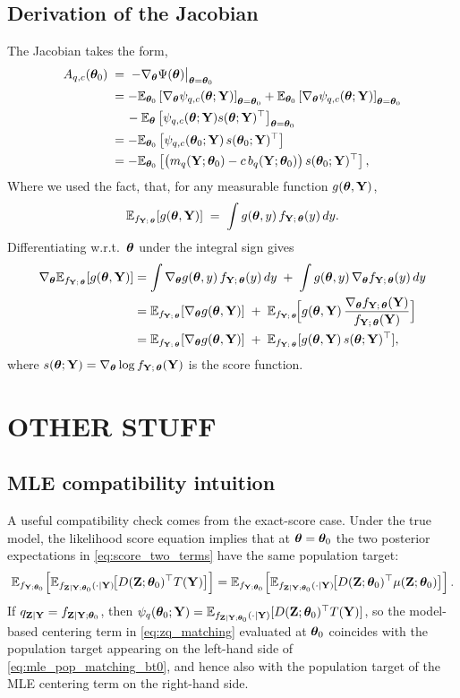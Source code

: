\subsection{Derivation of the Jacobian}
\label{math:jacobian}
The Jacobian takes the form,
%
\begin{align}
A_{q,c}({\bm{\theta}}_0)\;&=\;-\nabla_{\bm{\theta}} \Psi({\bm{\theta}})\big|_{{\bm{\theta}}={\bm{\theta}}_0}\\
&=-\mathbb{E}_{{\bm{\theta}}_0}\left[\nabla_{\bm{\theta}} \psi_{q,c}({\bm{\theta}};{\bf Y})\right]_{{\bm{\theta}}={{\bm{\theta}}_0}} + \mathbb{E}_{{\bm{\theta}}_0}\left[\nabla_{\bm{\theta}} \psi_{q,c}({\bm{\theta}};{\bf Y})\right]_{{\bm{\theta}}={{\bm{\theta}}_0}} \\
&\quad\, - \mathbb{E}_{{\bm{\theta}}}\left[\psi_{q,c}({\bm{\theta}};{\bf Y})s({\bm{\theta}};{\bf Y})^\top\right]_{{\bm{\theta}}={{\bm{\theta}}_0}}\\
&=-\mathbb{E}_{{\bm{\theta}}_0}\left[\psi_{q,c}({\bm{\theta}}_0;{\bf Y})\,s({\bm{\theta}}_0;{\bf Y})^\top\right]\\
&=-\mathbb{E}_{{\bm{\theta}}_0}\left[\big(m_q({\bf Y};{\bm{\theta}}_0)-c\,b_q({\bf Y};{\bm{\theta}}_0)\big)\,s({\bm{\theta}}_0;{\bf Y})^\top\right],
\end{align}
%
Where we used the fact, that, for any measurable function $g({\bm{\theta}},{\bf Y})$,
\[
\mathbb{E}_{f_{{\bf Y};\,{\bm{\theta}}}}[g({\bm{\theta}},{\bf Y})] \;=\; \int g({\bm{\theta}},y)\, f_{{\bf Y};\,{\bm{\theta}}}(y)\,dy.
\]
Differentiating w.r.t.\ ${\bm{\theta}}$ under the integral sign gives
\begin{align}
\nabla_{\bm{\theta}} \mathbb{E}_{f_{{\bf Y};\,{\bm{\theta}}}}[g({\bm{\theta}},{\bf Y})]
&= \int \nabla_{\bm{\theta}} g({\bm{\theta}},y)\, f_{{\bf Y};\,{\bm{\theta}}}(y)\,dy \;+\; \int g({\bm{\theta}},y)\,\nabla_{\bm{\theta}} f_{{\bf Y};\,{\bm{\theta}}}(y)\,dy\\
&= \mathbb{E}_{f_{{\bf Y};\,{\bm{\theta}}}}[\nabla_{\bm{\theta}} g({\bm{\theta}},{\bf Y})] \;+\; \mathbb{E}_{f_{{\bf Y};\,{\bm{\theta}}}}\!\Big[g({\bm{\theta}},{\bf Y})\,\frac{\nabla_{\bm{\theta}} f_{{\bf Y};\,{\bm{\theta}}}({\bf Y})}{f_{{\bf Y};\,{\bm{\theta}}}({\bf Y})}\Big]\\
&= \mathbb{E}_{f_{{\bf Y};\,{\bm{\theta}}}}[\nabla_{\bm{\theta}} g({\bm{\theta}},{\bf Y})] \;+\; \mathbb{E}_{f_{{\bf Y};\,{\bm{\theta}}}}[g({\bm{\theta}},{\bf Y})\,s({\bm{\theta}};{\bf Y})^\top],
\end{align}
where $s({\bm{\theta}};{\bf Y})=\nabla_{\bm{\theta}} \log f_{{\bf Y};\,{\bm{\theta}}}({\bf Y})$ is the score function.


\section{OTHER STUFF}

\subsection{MLE compatibility intuition}

A useful compatibility check comes from the exact-score case. Under the true model, the
likelihood score equation implies that at ${\bm{\theta}}={\bm{\theta}}_0$ the two posterior expectations in
\eqref{eq:score_two_terms} have the same population target:
\begin{equation}
\mathbb E_{f_{{\bf Y};{\bm{\theta}}_0}}
\!\left[
\mathbb{E}_{f_{{\bf Z}\mid{\bf Y};{\bm{\theta}}_0}(\cdot\mid {\bf Y})}\!\big[D({\bf Z};{\bm{\theta}}_0)^\top T({\bf Y})\big]
\right]
=
\mathbb E_{f_{{\bf Y};{\bm{\theta}}_0}}
\!\left[
\mathbb{E}_{f_{{\bf Z}\mid{\bf Y};{\bm{\theta}}_0}(\cdot\mid {\bf Y})}\!\big[D({\bf Z};{\bm{\theta}}_0)^\top \mu({\bf Z};{\bm{\theta}}_0)\big]
\right].
\label{eq:mle_pop_matching_bt0}
\end{equation}
If $q_{{\bf Z}\mid{\bf Y}}=f_{{\bf Z}\mid{\bf Y};{\bm{\theta}}_0}$, then
$\psi_q({\bm{\theta}}_0;{\bf Y})=\mathbb{E}_{f_{{\bf Z}\mid{\bf Y};{\bm{\theta}}_0}(\cdot\mid {\bf Y})}[D({\bf Z};{\bm{\theta}}_0)^\top T({\bf Y})]$, so
the model-based centering term in \eqref{eq:zq_matching} evaluated at ${\bm{\theta}}_0$ coincides with
the population target appearing on the left-hand side of \eqref{eq:mle_pop_matching_bt0}, and
hence also with the population target of the MLE centering term on the right-hand side.

